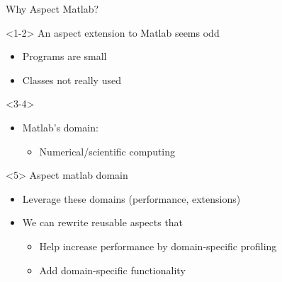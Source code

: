 \begin{frame}{Why Aspect Matlab?}
  \begin{onlyenv}<1-2>
    An aspect extension to Matlab seems odd
    \begin{itemize}
    \item Programs are small %
    \item Classes not really used
    \end{itemize}
  \end{onlyenv}
  \begin{onlyenv}<3-4>
    \begin{itemize}
    \item Matlab's domain:
      \begin{itemize}
      \item Numerical/scientific computing
      \end{itemize}
    \end{itemize}
  \end{onlyenv}
  \begin{onlyenv}<5>
    Aspect matlab domain
    \begin{itemize}
    \item Leverage these domains (performance, extensions)
    \item We can rewrite reusable aspects that
      \begin{itemize}
      \item Help increase performance by domain-specific profiling
      \item Add domain-specific functionality
      \end{itemize}
    \end{itemize}
  \end{onlyenv}
\end{frame}


